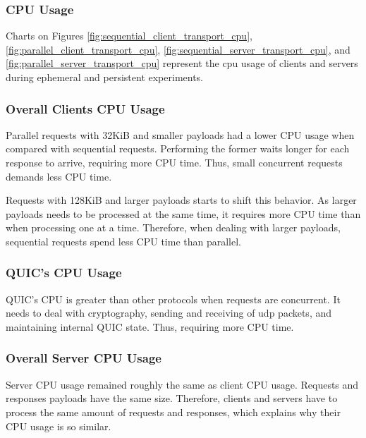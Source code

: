 \subsubsection{CPU Usage} 

Charts on Figures \ref{fig:sequential_client_transport_cpu}, \ref{fig:parallel_client_transport_cpu}, \ref{fig:sequential_server_transport_cpu}, and \ref{fig:parallel_server_transport_cpu} represent the \gls{cpu} usage of clients and servers during ephemeral and persistent experiments.

\subsubsection*{Overall Clients CPU Usage}

Parallel requests with 32KiB and smaller payloads had a lower CPU usage when compared with sequential requests. Performing the former waits longer for each response to arrive, requiring more CPU time. Thus, small concurrent requests demands less CPU time.

Requests with 128KiB and larger payloads starts to shift this behavior. As larger payloads needs to be processed at the same time, it requires more CPU time than when processing one at a time. Therefore, when dealing with larger payloads, sequential requests spend less CPU time than parallel. 

\subsubsection*{QUIC's CPU Usage}

QUIC's CPU is greater than other protocols when requests are concurrent. It needs to deal with cryptography, sending and receiving of \gls{udp} packets, and maintaining internal QUIC state. Thus, requiring more CPU time.

\subsubsection*{Overall Server CPU Usage}

Server CPU usage remained roughly the same as client CPU usage. Requests and responses payloads have the same size. Therefore, clients and servers have to process the same amount of requests and responses, which explains why their CPU usage is so similar.

\clearpage

